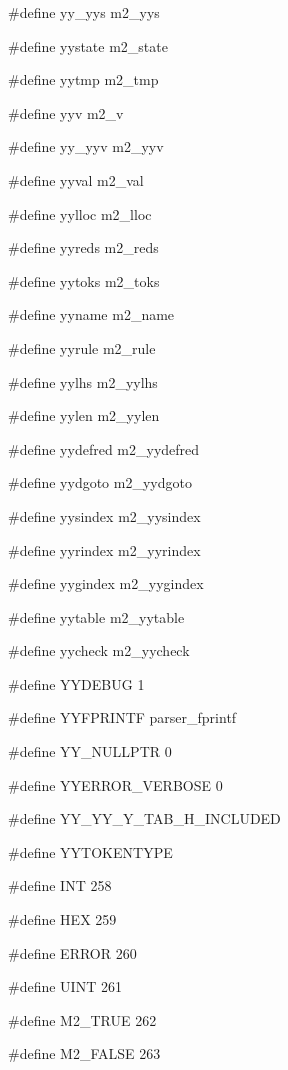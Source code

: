 \medskip
{\stt \#define yy\_yys m2\_yys}

\medskip
{\stt \#define yystate m2\_state}

\medskip
{\stt \#define yytmp m2\_tmp}

\medskip
{\stt \#define yyv m2\_v}

\medskip
{\stt \#define yy\_yyv m2\_yyv}

\medskip
{\stt \#define yyval m2\_val}

\medskip
{\stt \#define yylloc m2\_lloc}

\medskip
{\stt \#define yyreds m2\_reds}

\medskip
{\stt \#define yytoks m2\_toks}

\medskip
{\stt \#define yyname m2\_name}

\medskip
{\stt \#define yyrule m2\_rule}

\medskip
{\stt \#define yylhs m2\_yylhs}

\medskip
{\stt \#define yylen m2\_yylen}

\medskip
{\stt \#define yydefred m2\_yydefred}

\medskip
{\stt \#define yydgoto m2\_yydgoto}

\medskip
{\stt \#define yysindex m2\_yysindex}

\medskip
{\stt \#define yyrindex m2\_yyrindex}

\medskip
{\stt \#define yygindex m2\_yygindex}

\medskip
{\stt \#define yytable m2\_yytable}

\medskip
{\stt \#define yycheck m2\_yycheck}

\medskip
{\stt \#define YYDEBUG 1}

\medskip
{\stt \#define YYFPRINTF parser\_fprintf}

\medskip
{\stt \#define YY\_NULLPTR 0}

\medskip
{\stt \#define YYERROR\_VERBOSE 0}

\medskip
{\stt \#define YY\_YY\_Y\_TAB\_H\_INCLUDED}

\medskip
{\stt \#define YYTOKENTYPE}

\medskip
{\stt \#define INT 258}

\medskip
{\stt \#define HEX 259}

\medskip
{\stt \#define ERROR 260}

\medskip
{\stt \#define UINT 261}

\medskip
{\stt \#define M2\_TRUE 262}

\medskip
{\stt \#define M2\_FALSE 263}

